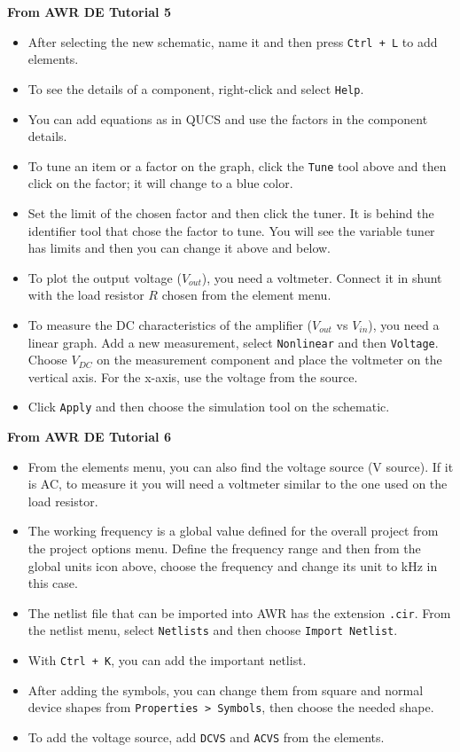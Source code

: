 \documentclass[english]{article}
\begin{document}
\textbf{From AWR DE Tutorial 5}
\begin{itemize}
    \item After selecting the new schematic, name it and then press \texttt{Ctrl + L} to add elements.
    \item To see the details of a component, right-click and select \texttt{Help}.
    \item You can add equations as in QUCS and use the factors in the component details.
    \item To tune an item or a factor on the graph, click the \texttt{Tune} tool above and then click on the factor; it will change to a blue color.
    \item Set the limit of the chosen factor and then click the tuner. It is behind the identifier tool that chose the factor to tune. You will see the variable tuner has limits and then you can change it above and below.
    \item To plot the output voltage (\( V_{out} \)), you need a voltmeter. Connect it in shunt with the load resistor \( R \) chosen from the element menu.
    \item To measure the DC characteristics of the amplifier (\( V_{out} \) vs \( V_{in} \)), you need a linear graph. Add a new measurement, select \texttt{Nonlinear} and then \texttt{Voltage}. Choose \( V_{DC} \) on the measurement component and place the voltmeter on the vertical axis. For the x-axis, use the voltage from the source.
    \item Click \texttt{Apply} and then choose the simulation tool on the schematic.
\end{itemize}

\textbf{From AWR DE Tutorial 6}
\begin{itemize}
    \item From the elements menu, you can also find the voltage source (V source). If it is AC, to measure it you will need a voltmeter similar to the one used on the load resistor.
    \item The working frequency is a global value defined for the overall project from the project options menu. Define the frequency range and then from the global units icon above, choose the frequency and change its unit to kHz in this case.
    \item The netlist file that can be imported into AWR has the extension \texttt{.cir}. From the netlist menu, select \texttt{Netlists} and then choose \texttt{Import Netlist}.
    \item With \texttt{Ctrl + K}, you can add the important netlist.
    \item After adding the symbols, you can change them from square and normal device shapes from \texttt{Properties > Symbols}, then choose the needed shape.
    \item To add the voltage source, add \texttt{DCVS} and \texttt{ACVS} from the elements.
\end{itemize}
\end{document}

